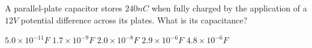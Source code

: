 \begin{questions}\setcounter{question}{13}\question
A parallel-plate capacitor stores $240 \unit{nC}$ when fully charged by the application of a $12 \unit{V}$ potential difference across its plates. What is its capacitance?

\begin{oneparchoices}
\choice $5.0 \times 10^{-11} \unit{F}$
\choice $1.7 \times 10^{-9} \unit{F}$
\choice $2.0 \times 10^{-8} \unit{F}$
\choice $2.9 \times 10^{-6} \unit{F}$
\choice $4.8 \times 10^{-6} \unit{F}$
\end{oneparchoices}\end{questions}
